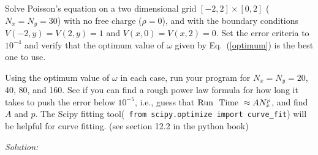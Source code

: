 \begin{enumerate}
\probtwo \label{P:19.4}
\begin{enumerate}
\subprob


  Solve Poisson's equation on a two dimensional grid $[-2,2] \times
  [0,2]$ ($N_x = N_y = 30$) with no free charge ($\rho =
  0$), and with
  the boundary conditions $V(-2,y) = V(2,y) = 1$ and $V(x,0) =
  V(x,2) = 0$.  Set the error criteria to $10^{-4}$ and verify that
  the optimum value of $\omega$ given by Eq.~(\ref{optimum}) is the
  best one to use.

\subprob Using the optimum value of $\omega$ in each case, run your
program for $N_x=N_y=20$, 40, 80, and 160. See if you can find a rough
power law formula for how long it takes to push the error below
$10^{-5}$, i.e., guess that ${\rm Run~~Time~} \approx A N_x^p$, and
find $A$ and $p$.  The Scipy fitting
tool(\verb! from scipy.optimize import curve_fit!) will be helpful for
curve fitting. (see section 12.2 in the python book)

\end{enumerate}
\end{enumerate}
\ifsolutions
\textit{Solution:}\\
